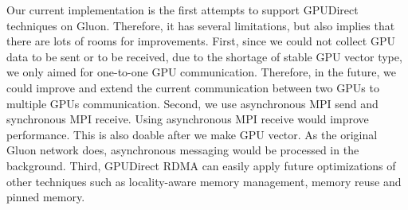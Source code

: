 Our current implementation is the first attempts to support GPUDirect techniques on Gluon.
Therefore, it has several limitations, but also implies that there are lots of rooms for improvements.
First, since we could not collect GPU data to be sent or to be received, due to the shortage of 
stable GPU vector type, we only aimed for one-to-one GPU communication.
Therefore, in the future, we could improve and extend the current communication between two GPUs to multiple GPUs communication.
Second, we use asynchronous MPI send and synchronous MPI receive.
Using asynchronous MPI receive would improve performance.
This is also doable after we make GPU vector. As the original Gluon network does, 
asynchronous messaging would be processed in the background.
Third, GPUDirect RDMA can easily apply future optimizations of other techniques such as locality-aware memory management,
memory reuse and pinned memory.
